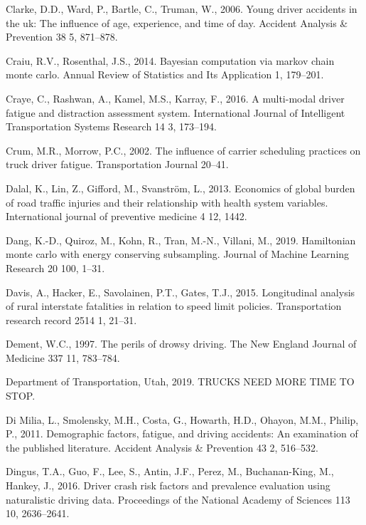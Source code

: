 \documentclass[12pt]{book}
\numberwithin{equation}{chapter}
\begin{document}
\leavevmode\hypertarget{ref-clarke2006young}{}%
Clarke, D.D., Ward, P., Bartle, C., Truman, W., 2006. Young driver accidents in the uk: The influence of age, experience, and time of day. Accident Analysis \& Prevention 38 5, 871--878.

\leavevmode\hypertarget{ref-craiu2014bayesian}{}%
Craiu, R.V., Rosenthal, J.S., 2014. Bayesian computation via markov chain monte carlo. Annual Review of Statistics and Its Application 1, 179--201.

\leavevmode\hypertarget{ref-craye2016multi}{}%
Craye, C., Rashwan, A., Kamel, M.S., Karray, F., 2016. A multi-modal driver fatigue and distraction assessment system. International Journal of Intelligent Transportation Systems Research 14 3, 173--194.

\leavevmode\hypertarget{ref-crum2002influence}{}%
Crum, M.R., Morrow, P.C., 2002. The influence of carrier scheduling practices on truck driver fatigue. Transportation Journal 20--41.

\leavevmode\hypertarget{ref-dalal2013economics}{}%
Dalal, K., Lin, Z., Gifford, M., Svanström, L., 2013. Economics of global burden of road traffic injuries and their relationship with health system variables. International journal of preventive medicine 4 12, 1442.

\leavevmode\hypertarget{ref-dang2019hamiltonian}{}%
Dang, K.-D., Quiroz, M., Kohn, R., Tran, M.-N., Villani, M., 2019. Hamiltonian monte carlo with energy conserving subsampling. Journal of Machine Learning Research 20 100, 1--31.

\leavevmode\hypertarget{ref-davis2015longitudinal}{}%
Davis, A., Hacker, E., Savolainen, P.T., Gates, T.J., 2015. Longitudinal analysis of rural interstate fatalities in relation to speed limit policies. Transportation research record 2514 1, 21--31.

\leavevmode\hypertarget{ref-dement1997perils}{}%
Dement, W.C., 1997. The perils of drowsy driving. The New England Journal of Medicine 337 11, 783--784.

\leavevmode\hypertarget{ref-utah2019}{}%
Department of Transportation, Utah, 2019. TRUCKS NEED MORE TIME TO STOP.

\leavevmode\hypertarget{ref-di2011demographic}{}%
Di Milia, L., Smolensky, M.H., Costa, G., Howarth, H.D., Ohayon, M.M., Philip, P., 2011. Demographic factors, fatigue, and driving accidents: An examination of the published literature. Accident Analysis \& Prevention 43 2, 516--532.

\leavevmode\hypertarget{ref-dingus2016driver}{}%
Dingus, T.A., Guo, F., Lee, S., Antin, J.F., Perez, M., Buchanan-King, M., Hankey, J., 2016. Driver crash risk factors and prevalence evaluation using naturalistic driving data. Proceedings of the National Academy of Sciences 113 10, 2636--2641.
\end{document}
